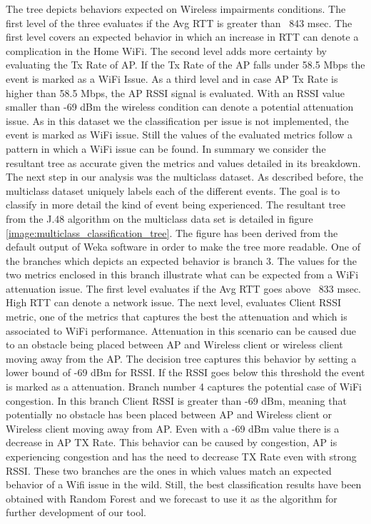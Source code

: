 The tree depicts behaviors expected on Wireless impairments conditions. The first level of the three evaluates if the Avg RTT is greater than ~843 msec. The first level covers an expected behavior in which an increase in RTT can denote a complication in the Home WiFi. The second level adds more certainty by evaluating the Tx Rate of AP. If the Tx Rate of the AP falls under 58.5 Mbps the event is marked as a WiFi Issue. As a third level and in case AP Tx Rate is higher than 58.5 Mbps, the AP RSSI signal is evaluated. With an RSSI value smaller than -69 dBm the wireless condition can denote a potential attenuation issue. As in this dataset we the classification per issue is not implemented, the event is marked as WiFi issue. Still the values of the evaluated metrics follow a pattern in which a WiFi issue can be found. In summary we consider the resultant tree as accurate given the metrics and values detailed in its breakdown. The next step in our analysis was the multiclass dataset. As described before, the multiclass dataset uniquely labels each of the different events. The goal is to classify in more detail the kind of event being experienced. The resultant tree from the J.48 algorithm on the multiclass data set is detailed in figure \ref{image:multiclass_classification_tree}. The figure has been derived from the default output of Weka software in order to make the tree more readable. One of the branches which depicts an expected behavior is branch 3. The values for the two metrics enclosed in this branch illustrate what can be expected from a WiFi attenuation issue. The first level evaluates if the Avg RTT goes above ~833 msec. High RTT can denote a network issue. The next level, evaluates Client RSSI metric, one of the metrics that captures the best the attenuation and which is associated to WiFi performance. Attenuation in this scenario can be caused due to an obstacle being placed between AP and Wireless client or wireless client moving away from the AP. The decision tree captures this behavior by setting a lower bound of -69 dBm for RSSI. If the RSSI goes below this threshold the event is marked as a attenuation. Branch number 4 captures the potential case of WiFi congestion. In this branch Client RSSI is greater than -69 dBm, meaning that potentially no obstacle has been placed between AP and Wireless client or Wireless client moving away from AP. Even with a -69 dBm value there is a decrease in AP TX Rate. This behavior can be caused by congestion, AP is experiencing congestion and has the need to decrease TX Rate even with strong RSSI. These two branches are the ones in which values match an expected behavior of a Wifi issue in the wild. Still, the best classification results have been obtained with Random Forest and we forecast to use it as the algorithm for further development of our tool.


\newpage


